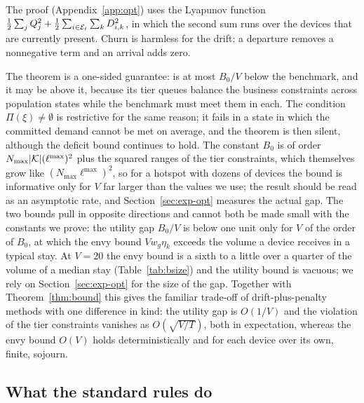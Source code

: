 The proof (Appendix~\ref{app:opt}) uses the Lyapunov function $\tfrac12\sum_jQ_j^2+\tfrac12\sum_{i\in\mathcal{E}_t}\sum_kD_{i,k}^2$, in which the second sum runs over the devices that are currently present.
Churn is harmless for the drift: a departure removes a nonnegative term and an arrival adds zero.

The theorem is a one-sided guarantee: \repay{} is at most $B_0/V$ below the benchmark, and it may be above it, because its tier queues balance the business constraints across population states while the benchmark must meet them in each.
The condition $\Pi(\xi)\neq\emptyset$ is restrictive for the same reason; it fails in a state in which the committed demand cannot be met on average, and the theorem is then silent, although the deficit bound continues to hold.
The constant $B_0$ is of order $N_{\max}|\mathcal{K}|(\ell^{\max})^2$ plus the squared ranges of the tier constraints, which themselves grow like $(N_{\max}\ell^{\max})^2$, so for a hotspot with dozens of devices the bound is informative only for $V$ far larger than the values we use; the result should be read as an asymptotic rate, and Section~\ref{sec:exp-opt} measures the actual gap.
The two bounds pull in opposite directions and cannot both be made small with the constants we prove: the utility gap $B_0/V$ is below one unit only for $V$ of the order of $B_0$, at which the envy bound $Vw_g\eta_k$ exceeds the volume a device receives in a typical stay. At $V=20$ the envy bound is a sixth to a little over a quarter of the volume of a median stay (Table~\ref{tab:bsize}) and the utility bound is vacuous; we rely on Section~\ref{sec:exp-opt} for the size of the gap.
Together with Theorem~\ref{thm:bound} this gives the familiar trade-off of drift-plus-penalty methods with one difference in kind: the utility gap is $O(1/V)$ and the violation of the tier constraints vanishes as $O(\sqrt{V/T})$, both in expectation, whereas the envy bound $O(V)$ holds deterministically and for each device over its own, finite, sojourn.

\subsection{What the standard rules do}\label{sec:baselines-theory}

